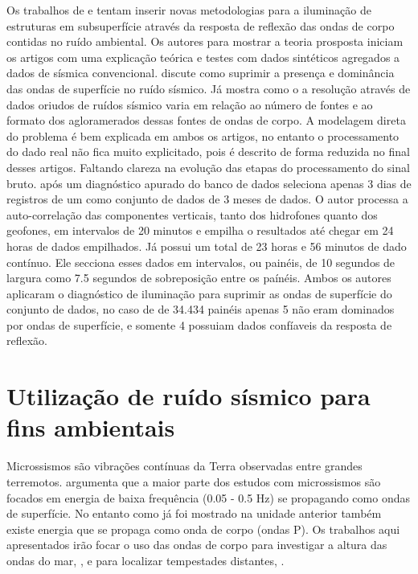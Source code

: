\documentclass[paper,twocolumn]{geophysics}
\begin{document}
Os trabalhos de \cite{vidal_retrieval_2014} e \cite{boullenger_studying_2015} tentam inserir novas metodologias para a iluminação de estruturas em subsuperfície através da resposta de reflexão das ondas de corpo contidas no ruído ambiental. Os autores para mostrar a teoria prosposta iniciam os artigos com uma explicação teórica e testes com dados sintéticos agregados a dados de sísmica convencional. \cite{vidal_retrieval_2014} discute como suprimir a presença e dominância das ondas de superfície no ruído sísmico. Já \cite{boullenger_studying_2015} mostra como o a resolução através de dados oriudos de ruídos sísmico varia em relação ao número de fontes e ao formato dos agloramerados dessas fontes de ondas de corpo. A modelagem direta do problema é bem explicada em ambos os artigos, no entanto o processamento do dado real não fica muito explicitado, pois é descrito de forma reduzida no final desses artigos. Faltando clareza na evolução das etapas do processamento do sinal bruto. \cite{boullenger_studying_2015} após um diagnóstico apurado do banco de dados seleciona apenas 3 dias de registros  de um como conjunto de dados de 3 meses de dados. O autor processa a auto-correlação das componentes verticais, tanto dos hidrofones quanto dos geofones, em intervalos de 20 minutos e empilha o resultados até chegar em 24 horas de dados empilhados. Já \cite{vidal_retrieval_2014} possui um total de 23 horas e 56 minutos de dado contínuo. Ele secciona esses dados em intervalos, ou painéis, de 10 segundos de largura como 7.5 segundos de sobreposição entre os paínéis. Ambos os autores aplicaram o diagnóstico de iluminação para suprimir as ondas de superfície do conjunto de dados, no caso de \cite{vidal_retrieval_2014} de 34.434 painéis apenas 5 não eram dominados por ondas de superfície, e somente 4 possuiam dados confíaveis da resposta de reflexão.

\section*{Utilização de ruído sísmico para fins ambientais}

Microssismos são vibrações contínuas da Terra observadas entre grandes terremotos. \cite{gerstoft_global_2008} argumenta que a maior parte dos estudos com microssismos são focados em energia de baixa frequência (0.05 - 0.5 Hz) se propagando como ondas de superfície. No entanto como já foi mostrado na unidade anterior também existe energia que se propaga como onda de corpo (ondas P). Os trabalhos aqui apresentados irão focar o uso das ondas de corpo para investigar a altura das ondas do mar, \cite{bromirski_ocean_1999}, e para localizar tempestades distantes, \cite{gerstoft_global_2008}.
\end{document}
